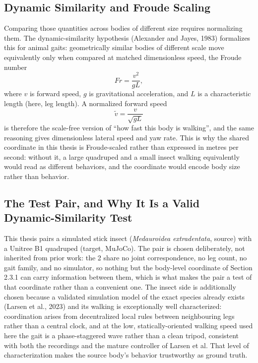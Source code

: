 \documentclass[12pt,a4paper,oneside]{report}
\begin{document}
\subsection{Dynamic Similarity and Froude Scaling}
Comparing those quantities across bodies of different size requires normalizing them. The
dynamic-similarity hypothesis (Alexander and Jayes, 1983) formalizes this for animal gaits:
geometrically similar bodies of different scale move equivalently only when compared at matched
dimensionless speed, the Froude number
\[
Fr = \frac{v^2}{gL},
\]
where $v$ is forward speed, $g$ is gravitational acceleration, and $L$ is a characteristic length (here, leg
length). A normalized forward speed
\[
\tilde{v} = \frac{v}{\sqrt{gL}}
\]
is therefore the scale-free version of ``how fast this body is walking'', and the same reasoning gives
dimensionless lateral speed and yaw rate. This is why the
shared coordinate in this thesis is Froude-scaled rather than expressed in metres per second: without
it, a large quadruped and a small insect walking equivalently would read as different behaviors, and
the coordinate would encode body size rather than behavior.

\newpage
\subsection{The Test Pair, and Why It Is a Valid Dynamic-Similarity Test}
This thesis pairs a simulated stick insect (\emph{Medauroidea extradentata}, source) with a Unitree B1
quadruped (target, MuJoCo). The pair is chosen deliberately, not inherited from prior work: the 2
share no joint correspondence, no leg count, no gait family, and no simulator, so nothing but the
body-level coordinate of Section 2.3.1 can carry information between them, which is what makes the
pair a test of that coordinate rather than a convenient one. The insect side is additionally
chosen because a validated simulation model of the exact species already exists (Larsen et al., 2023)
and its walking is exceptionally well characterized: coordination arises from decentralized local
rules between neighbouring legs rather than a central clock, and at the low,
statically-oriented walking speed used here the gait is a phase-staggered wave rather than a clean
tripod, consistent with both the recordings and the mature controller of Larsen et al. That level of
characterization makes the source body's behavior trustworthy as ground truth.

\end{document}
